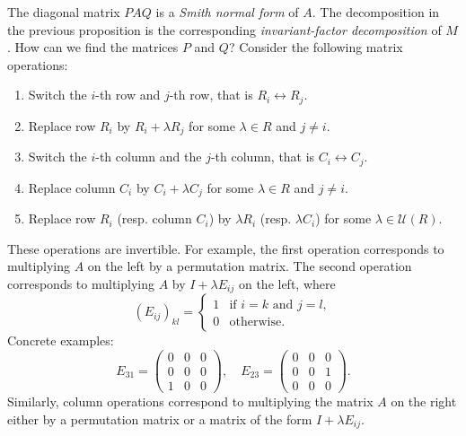 The diagonal matrix $PAQ$ is a \emph{Smith normal form} of $A$.
The decomposition in the previous proposition is the corresponding
\emph{invariant-factor decomposition} of $M$. 
How can we find the matrices $P$ and $Q$? 
Consider the following matrix operations: 
\begin{enumerate}
	\item Switch the $i$-th row and $j$-th row, that is $R_i\leftrightarrow R_j$.
	\item Replace row $R_i$ by $R_i+\lambda R_j$ for some $\lambda\in R$ and $j\ne i$.
	\item Switch the $i$-th column and the $j$-th column, that is $C_i\leftrightarrow C_j$.
	\item Replace column $C_i$ by $C_i+\lambda C_j$ for some $\lambda\in R$ and $j\ne i$. 
	\item Replace row $R_i$ (resp. column $C_i$) by $\lambda R_i$ (resp. $\lambda C_i$) 
	for some $\lambda\in\mathcal{U}(R)$. 
\end{enumerate}
These operations are invertible. For example, the first operation
corresponds to multiplying $A$ on the left by a permutation matrix. 
The second
operation corresponds to multiplying $A$ by $I+\lambda E_{ij}$ on the left, 
where 
\[
(E_{ij})_{kl}=\begin{cases}
1 & \text{if $i=k$ and $j=l$},\\
0 & \text{otherwise}.	
\end{cases}
\]
Concrete examples:
\[
E_{31}=
\begin{pmatrix}
    0 & 0 & 0\\
    0 & 0 & 0\\
    1 & 0 & 0
\end{pmatrix},
\quad
E_{23}=\begin{pmatrix}
    0 & 0 & 0\\
    0 & 0 & 1\\
    0 & 0 & 0
\end{pmatrix}.
\]
Similarly, column operations correspond to multiplying the matrix $A$ on the right 
either by a permutation matrix or a matrix of the form $I+\lambda E_{ij}$. 

